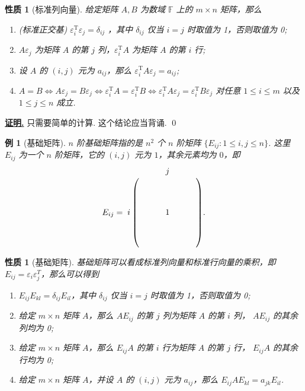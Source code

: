\documentclass[10pt,openany]{article}
\theoremstyle{thmstyle} %
\theoremstyle{defstyle} %
\theoremstyle{prostyle} %
\newtheorem{property}[theorem]{性质}
\theoremstyle{exastyle}
\newtheorem{example}[theorem]{例}
\theoremstyle{remstyle}
\renewenvironment{proof}[1][证明]{\par\underline{\textbf{#1.}} \;\fangsong}{\qed\par}
\newcommand{\T}{^{\text{T}}}
\newcommand{\F}{\mathbb{F}}
\begin{document}
\begin{property}[标准列向量]
	给定矩阵 \( A,B \) 为数域 \( \F \) 上的 \( m \times n \) 矩阵，那么
	\begin{enumerate}[(1)]
		\item(标准正交基) \( \varepsilon_i\T\varepsilon_j = \delta_{ij} \) ，其中 \( \delta_{ij} \) 仅当 \( i=j \) 时取值为 1，否则取值为 0;
		\item \( A\varepsilon_j \) 为矩阵 \( A \) 的第 \( j \) 列，\( \varepsilon_i\T A \) 为矩阵 \( A \) 的第 \( i \) 行;
		\item 设 \( A \) 的 \( (i,j) \) 元为 \( a_{ij} \)，那么 \( \varepsilon_i\T A\varepsilon_j =a_{ij} \);
		\item \( A=B \Leftrightarrow A\varepsilon_j = B\varepsilon_j \Leftrightarrow \varepsilon_i\T A = \varepsilon_i\T B \Leftrightarrow \varepsilon_i\T A\varepsilon_j = \varepsilon_i\T B\varepsilon_j  \) 对任意 \( 1 \leq i \leq m \) 以及 \( 1 \leq j \leq n \) 成立.
	\end{enumerate} 
	\label{1.3.14}
\end{property}

\begin{proof}
	只需要简单的计算. 这个结论应当背诵.
\end{proof}

\begin{example}[基础矩阵]
	\( n \) 阶基础矩阵指的是 \( n^2 \) 个 \( n \) 阶矩阵 \( \{E_{ij}:1 \leq i,j \leq n\} \). 这里 \( E_{ij} \) 为一个 \( n \) 阶矩阵，它的 \( (i,j) \) 元为 \( 1 \)，其余元素均为 \( 0 \)，即
	\[ E_{ij}=\bordermatrix{
		& & & & \textbf{\(j\)} & & &  \cr
		&  & & & &  & &  \cr
		& &  & & &  & &  \cr
		& & &  & &  & &  \cr
		\textbf{\(i\)}	& & & & 1 & & &   \cr
		& &  & & &   & &  \cr
		& & & &  & & &  \cr
		& & & & & & &   
	}. \]
\end{example}

\begin{property}[基础矩阵]
	基础矩阵可以看成标准列向量和标准行向量的乘积，即 \( E_{ij}=\varepsilon_i\varepsilon_j^{T} \)，那么可以得到
	\begin{enumerate}[(1)]
		\item \( E_{ij}E_{kl}=\delta_{ij}E_{il} \)，其中 \( \delta_{ij} \) 仅当 \( i=j \) 时取值为 1，否则取值为 0;
		\item 给定 \( m \times n \) 矩阵 \( A \)，那么 \( AE_{ij} \) 的第 \( j \) 列为矩阵 \( A \) 的第 \( i \) 列， \( AE_{ij} \) 的其余列均为 0;
		\item 给定 \( m \times n \) 矩阵 \( A \)，那么 \( E_{ij}A \) 的第 \( i \) 行为矩阵 \( A \) 的第 \( j \) 行， \( E_{ij}A \) 的其余行均为 0;
		\item 给定 \( m \times n \) 矩阵 \( A \)，并设 \( A \) 的 \( (i,j) \) 元为 \( a_{ij} \)，那么 \( E_{ij}AE_{kl} =a_{jk}E_{il} \).
	\end{enumerate}
	\label{1.3.16}
\end{property}
\end{document}
